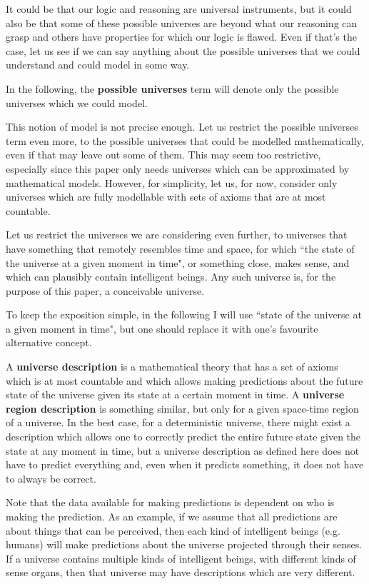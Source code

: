 \documentclass[a4paper
,draft
]{article}
\newcommand{\definitie}[1]{\textbf{#1}}
\newcommand{\ghilimele}[1]{``#1"}
\begin{document}
It could be that our logic and reasoning are universal instruments,
but it could also be that some of these possible universes are
beyond what our reasoning can grasp and others have properties
for which our logic is flawed.
Even if that's the case, let us see if we can say anything about
the possible universes that we could understand and could model in some way.

In the following, the \definitie{possible universes} term will denote
only the possible universes which we could model.

This notion of model is not precise enough.
Let us restrict the possible universes term even more,
to the possible universes that could be modelled mathematically,
even if that may leave out some of them.
This may seem too restrictive,
especially since this paper only needs universes which can be approximated
by mathematical models.
However, for simplicity, let us, for now, consider only universes
which are fully modellable with sets of axioms that are at most countable.

Let us restrict the universes we are considering even further, to universes that
have something that remotely resembles time and space, for which
\ghilimele{the state of the universe at a given moment in time}, or something
close, makes sense, and which can plausibly contain intelligent beings.
Any such universe is, for the purpose of this paper, a conceivable universe.

To keep the exposition simple, in the following I will use
\ghilimele{state of the universe at a given moment in time},
but one should replace it with one's favourite alternative concept.

A \definitie{universe description} is a mathematical theory that has
a set of axioms which is at most countable and which allows making
predictions about the future state of the universe given its state
at a certain moment in time. A \definitie{universe region description}
is something similar, but only for a given space-time region of a universe.
In the best case, for a deterministic universe, there might exist
a description which allows one to correctly predict the entire future state
given the state at any moment in time, but a universe description
as defined here does not have to predict everything and,
even when it predicts something, it does not have to always be correct.

Note that the data available for making predictions is dependent
on who is making the prediction. As an example, if we assume that
all predictions are about things that can be perceived, then
each kind of intelligent beings (e.g. humans) will make predictions
about the universe projected through their senses. If a universe contains
multiple kinds of intelligent beings, with different kinds of
sense organs, then that universe may have descriptions which are
very different.
\end{document}
